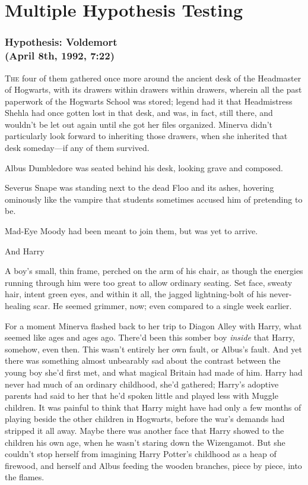 
\cleartorecto


\chapter{Multiple Hypothesis Testing}

\subsection{Hypothesis: Voldemort\\
(April 8th, 1992, 7:22\PM)}

\lettrine{T}{he} four of them gathered once more around the ancient desk of the Headmaster
of Hogwarts, with its drawers within drawers within drawers, wherein all the
past paperwork of the Hogwarts School was stored; legend had it that
Headmistress Shehla had once gotten lost in that desk, and was, in fact, still
there, and wouldn't be let out again until she got her files organized. Minerva
didn't particularly look forward to inheriting those drawers, when she
inherited that desk someday—if any of them survived.

Albus Dumbledore was seated behind his desk, looking grave and composed.

Severus Snape was standing next to the dead Floo and its ashes, hovering
ominously like the vampire that students sometimes accused him of pretending to
be.

Mad-Eye Moody had been meant to join them, but was yet to arrive.

And Harry{\el}

A boy's small, thin frame, perched on the arm of his chair, as though the
energies running through him were too great to allow ordinary seating. Set
face, sweaty hair, intent green eyes, and within it all, the jagged
lightning-bolt of his never-healing scar. He seemed grimmer, now; even compared
to a single week earlier.

For a moment Minerva flashed back to her trip to Diagon Alley with Harry, what
seemed like ages and ages ago. There'd been this somber boy \emph{inside} that
Harry, somehow, even then. This wasn't entirely her own fault, or Albus's
fault. And yet there was something almost unbearably sad about the contrast
between the young boy she'd first met, and what magical Britain had made of
him. Harry had never had much of an ordinary childhood, she'd gathered; Harry's
adoptive parents had said to her that he'd spoken little and played less with
Muggle children. It was painful to think that Harry might have had only a few
months of playing beside the other children in Hogwarts, before the war's
demands had stripped it all away. Maybe there was another face that Harry
showed to the children his own age, when he wasn't staring down the Wizengamot.
But she couldn't stop herself from imagining Harry Potter's childhood as a heap
of firewood, and herself and Albus feeding the wooden branches, piece by piece,
into the flames.

